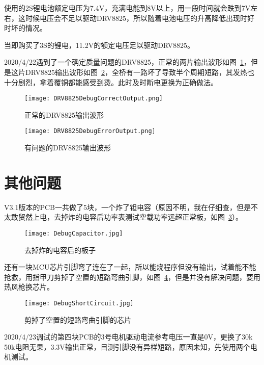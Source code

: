 使用的2S锂电池额定电压为7.4V，充满电能到8V以上，用一段时间就会跌到7V左右，这时候电压会不足以驱动DRV8825，所以随着电池电压的升高降低出现时好时坏的情况。

当即购买了3S的锂电，11.2V的额定电压足以驱动DRV8825。

2020/4/22遇到了一个确定质量问题的DRV8825，正常的两片输出波形如图~\ref{fig:DRV8825DebugCorrectOutput}，但是这片DRV8825输出波形如图~\ref{fig:DRV8825DebugErrorOutput}，全桥有一路坏了导致半个周期短路，其发热也十分剧烈，拿着覆铜都能感受到烫。此时及时断电更换为正确做法。

\begin{figure}[htbp]
    \centering
    \texttt{[image: DRV8825DebugCorrectOutput.png]}
    \caption{正常的DRV8825输出波形}
    \label{fig:DRV8825DebugCorrectOutput}
\end{figure}

\begin{figure}[htbp]
    \centering
    \texttt{[image: DRV8825DebugErrorOutput.png]}
    \caption{有问题的DRV8825输出波形}
    \label{fig:DRV8825DebugErrorOutput}
\end{figure}


\section{其他问题}

V3.1版本的PCB一共做了5块，一个炸了钽电容（原因不明，我在仔细查，但是不太敢贸然上电，去掉炸的电容后功率表测试空载功率远超正常板，如图~\ref{fig:DebugCapacitor}）。

\begin{figure}[htbp]
    \centering
    \texttt{[image: DebugCapacitor.jpg]}
    \caption{去掉炸的电容后的板子}
    \label{fig:DebugCapacitor}
\end{figure}

还有一块MCU芯片引脚弯了连在了一起，所以能烧程序但没有输出，试着能不能抢救，用指甲刀剪掉了空置的短路弯曲引脚，如图~\ref{fig:DebugShortCircuit}，但是并没有解决问题，要用热风枪换芯片。

\begin{figure}[htbp]
    \centering
    \texttt{[image: DebugShortCircuit.jpg]}
    \caption{剪掉了空置的短路弯曲引脚的芯片}
    \label{fig:DebugShortCircuit}
\end{figure}

2020/4/23调试的第四块PCB的3号电机驱动电流参考电压一直是0V，更换了30k 50k电阻无果，3.3V输出正常，目测引脚没有异样短路，原因未知，先使用两个电机测试。